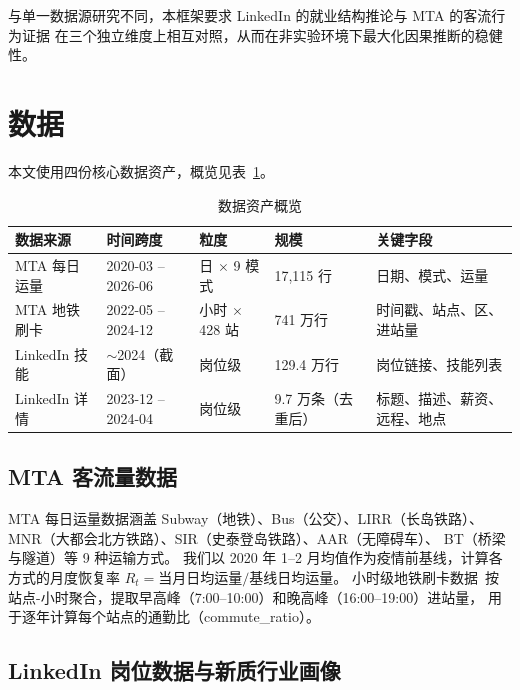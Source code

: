 \documentclass[runningheads]{llncs}
\begin{document}
与单一数据源研究不同，本框架要求 LinkedIn 的就业结构推论与 MTA 的客流行为证据
在三个独立维度上相互对照，从而在非实验环境下最大化因果推断的稳健性。

\section{数据}

本文使用四份核心数据资产，概览见表~\ref{tab:data}。

\begin{table}[H]
\centering
\caption{数据资产概览}
\label{tab:data}
\footnotesize
\begin{tabular}{@{}p{2.5cm}p{2.2cm}p{2.3cm}p{1.6cm}p{2.5cm}@{}}
\toprule
\textbf{数据来源} & \textbf{时间跨度} & \textbf{粒度} & \textbf{规模} & \textbf{关键字段} \\
\midrule
MTA 每日运量   & 2020-03 -- 2026-06 & 日 $\times$ 9 模式 & 17,115 行 & 日期、模式、运量 \\
MTA 地铁刷卡   & 2022-05 -- 2024-12 & 小时 $\times$ 428 站 & 741 万行 & 时间戳、站点、区、进站量 \\
LinkedIn 技能  & $\sim$2024（截面） & 岗位级 & 129.4 万行 & 岗位链接、技能列表 \\
LinkedIn 详情  & 2023-12 -- 2024-04 & 岗位级 & 9.7 万条（去重后） & 标题、描述、薪资、远程、地点 \\
\bottomrule
\end{tabular}
\end{table}

\subsection{MTA 客流量数据}

MTA 每日运量数据涵盖 Subway（地铁）、Bus（公交）、LIRR（长岛铁路）、
MNR（大都会北方铁路）、SIR（史泰登岛铁路）、AAR（无障碍车）、
BT（桥梁与隧道）等 9 种运输方式。
我们以 2020 年 1--2 月均值作为疫情前基线，计算各方式的月度恢复率
$R_t = \text{当月日均运量} / \text{基线日均运量}$。
小时级地铁刷卡数据~\cite{mtaturnstilekaggle2024}按站点-小时聚合，提取早高峰（7:00--10:00）和晚高峰（16:00--19:00）进站量，
用于逐年计算每个站点的通勤比（commute\_ratio）。

\subsection{LinkedIn 岗位数据与新质行业画像}
\end{document}

